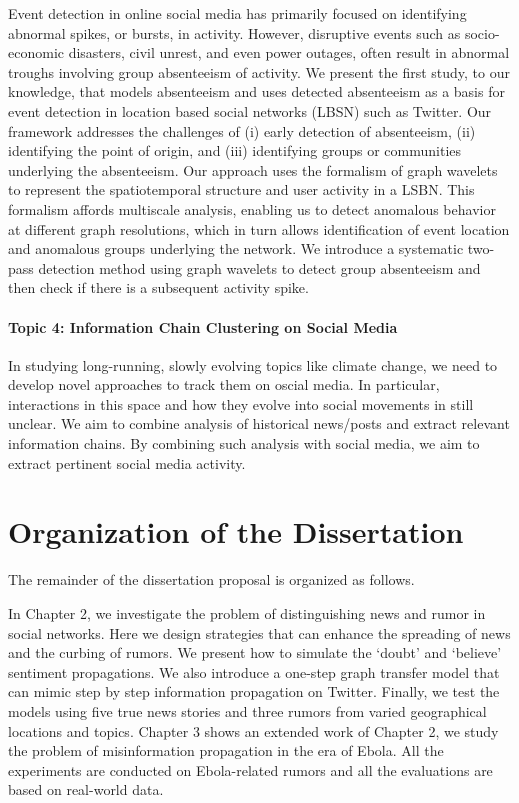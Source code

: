 Event detection in online social media has primarily focused on identifying
abnormal spikes, or bursts, in activity. However, disruptive events such as socio-economic disasters, civil unrest, and even power outages, often result in abnormal troughs involving group absenteeism of activity. We present the first study, to our knowledge, that models absenteeism and uses detected absenteeism as a basis for event detection in location based social networks (LBSN) such as Twitter. Our framework addresses the challenges of (i) early detection of absenteeism, (ii) identifying the point of origin, and (iii) identifying groups or communities underlying the absenteeism. Our approach uses the formalism of graph wavelets to represent the spatiotemporal structure and user activity in a LSBN. This formalism affords multiscale analysis, enabling us to detect anomalous behavior at different graph resolutions, which in turn allows identification of event location and anomalous groups underlying the network. We introduce a systematic two-pass detection method using graph wavelets to detect group absenteeism and then check if there is a subsequent activity spike.

\paragraph{Topic 4: Information Chain Clustering on Social Media}
In studying long-running, slowly evolving topics like climate change, we need to develop
novel approaches to track them on oscial media. In particular, interactions in this space and how
they evolve into social movements in still unclear. 
We aim to combine analysis of
historical news/posts and extract
relevant information chains. By combining such analysis with social media, we aim to extract
pertinent social media activity.

\section{Organization of the Dissertation}
The remainder of the dissertation proposal is organized as follows.

In Chapter 2, we investigate the problem of distinguishing news and rumor in social networks. Here we design strategies that can enhance the spreading of news and the curbing of rumors. We present how to simulate the `doubt' and `believe' sentiment propagations. We also introduce a one-step graph transfer model that can mimic step by step information propagation on Twitter. Finally, we test the models using five true news stories and three rumors from varied geographical locations and topics. Chapter 3 shows an extended work of Chapter 2, we study the problem of misinformation propagation in the era of Ebola. All the experiments are conducted on Ebola-related rumors and all the evaluations are based on real-world data.

